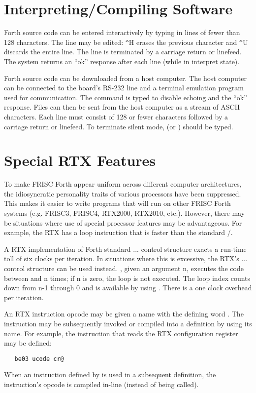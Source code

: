 \section{Interpreting/Compiling Software}
Forth source code can be entered interactively by typing in lines
of fewer than 128 characters.  The line may be edited:
\verb|^|H erases the previous character and \verb|^|U
discards the entire line.  The line is terminated by a carriage
return or linefeed.  The system returns an ``ok'' response
after each line (while in interpret state).

Forth source code can be downloaded from a host computer.
The host computer can be connected to the board's RS-232 line
and a terminal emulation program used for communication.
The command 
is typed to disable echoing and the ``ok'' response.  Files can
then be sent from the host computer as a stream of ASCII characters.
Each line must consist of 128 or fewer characters
followed by a carriage return or linefeed.
To terminate silent mode,  (or ) should be typed.

\section{Special RTX Features}
To make FRISC Forth appear uniform across different computer architectures,
the idiosyncratic personality traits of various processors have been
suppressed.  This makes it easier to write programs that will
run on other FRISC Forth systems (e.g. FRISC3, FRISC4, RTX2000,
RTX2010, etc.).  However, there may be situations where use of special
processor features may be advantageous.  For example, the RTX has
a loop instruction that is faster than the standard /.

A RTX implementation of Forth standard  ...  control
structure exacts a run-time toll of six clocks per iteration.  In
situations where this is excessive, the RTX's  ... 
control structure can be used instead. 
, given an argument \num{n},
executes the code between  and  \num{n} times;
if \num{n} is zero, the loop is not executed.  The loop index
counts down from \num{n-1} through 0 and is available by using .
There is a one clock overhead per iteration.

An RTX instruction opcode may be given a name with the defining word
.  The instruction may be subsequently invoked or compiled
into a definition by using its name.  For example, the instruction
that reads the RTX configuration register may be defined:
\begin{verbatim}
   be03 ucode cr@
\end{verbatim}
When an instruction defined by  is used in a subsequent
definition, the instruction's opcode is compiled in-line (instead of
being called).


